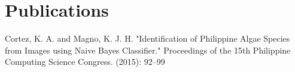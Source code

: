 \documentclass[top=0in]{deedy-resume-openfont}
\begin{document}
\begin{minipage}[t]{0.66\textwidth}
%


\section{Publications}\label{sec:publications}
\renewcommand\refname{\vskip -1.5em} %
Cortez, K. A. and Magno, K. J. H. "Identification of Philippine Algae Species from Images using Naive Bayes Classifier."
Proceedings of the 15th Philippine Computing Science Congress. (2015): 92--99
%
%

\end{minipage} 
\end{document}
